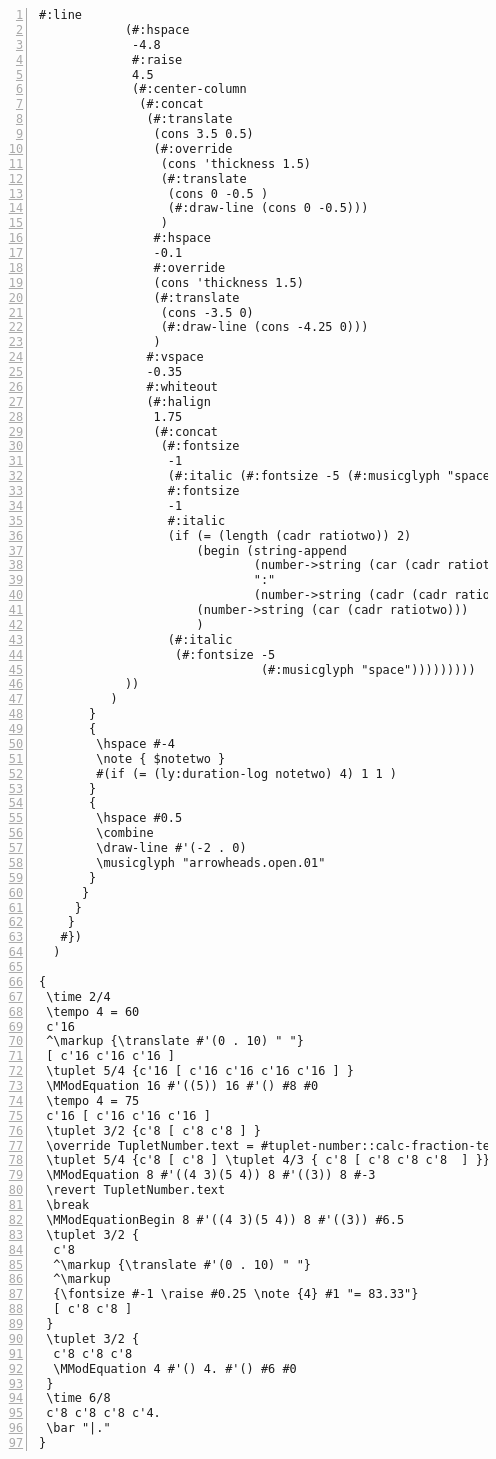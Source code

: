 \begin{Verbatim}[numbers=left,xleftmargin=5mm]
            #:line
            (#:hspace
             -4.8
             #:raise
             4.5
             (#:center-column
              (#:concat
               (#:translate
                (cons 3.5 0.5)
                (#:override
                 (cons 'thickness 1.5)
                 (#:translate
                  (cons 0 -0.5 )
                  (#:draw-line (cons 0 -0.5)))
                 )
                #:hspace
                -0.1
                #:override
                (cons 'thickness 1.5)
                (#:translate
                 (cons -3.5 0)
                 (#:draw-line (cons -4.25 0)))
                )
               #:vspace
               -0.35
               #:whiteout
               (#:halign
                1.75
                (#:concat
                 (#:fontsize
                  -1
                  (#:italic (#:fontsize -5 (#:musicglyph "space")))
                  #:fontsize
                  -1
                  #:italic
                  (if (= (length (cadr ratiotwo)) 2)
                      (begin (string-append
                              (number->string (car (cadr ratiotwo)))
                              ":"
                              (number->string (cadr (cadr ratiotwo)))))
                      (number->string (car (cadr ratiotwo)))
                      )
                  (#:italic
                   (#:fontsize -5
                               (#:musicglyph "space")))))))))
            ))
          )
       }
       {
        \hspace #-4
        \note { $notetwo }
        #(if (= (ly:duration-log notetwo) 4) 1 1 )
       }
       {
        \hspace #0.5
        \combine
        \draw-line #'(-2 . 0)
        \musicglyph "arrowheads.open.01"
       }
      }
     }
    }
   #})
  )

{
 \time 2/4
 \tempo 4 = 60
 c'16
 ^\markup {\translate #'(0 . 10) " "}
 [ c'16 c'16 c'16 ]
 \tuplet 5/4 {c'16 [ c'16 c'16 c'16 c'16 ] }
 \MModEquation 16 #'((5)) 16 #'() #8 #0
 \tempo 4 = 75
 c'16 [ c'16 c'16 c'16 ]
 \tuplet 3/2 {c'8 [ c'8 c'8 ] }
 \override TupletNumber.text = #tuplet-number::calc-fraction-text
 \tuplet 5/4 {c'8 [ c'8 ] \tuplet 4/3 { c'8 [ c'8 c'8 c'8  ] }}
 \MModEquation 8 #'((4 3)(5 4)) 8 #'((3)) 8 #-3
 \revert TupletNumber.text
 \break
 \MModEquationBegin 8 #'((4 3)(5 4)) 8 #'((3)) #6.5
 \tuplet 3/2 {
  c'8
  ^\markup {\translate #'(0 . 10) " "}
  ^\markup
  {\fontsize #-1 \raise #0.25 \note {4} #1 "= 83.33"}
  [ c'8 c'8 ]
 }
 \tuplet 3/2 {
  c'8 c'8 c'8
  \MModEquation 4 #'() 4. #'() #6 #0
 }
 \time 6/8
 c'8 c'8 c'8 c'4.
 \bar "|."
}
\end{Verbatim}
